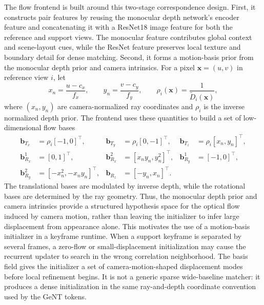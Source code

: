 The flow frontend is built around this two-stage correspondence design.
First, it constructs pair features by reusing the monocular depth network's encoder feature and concatenating it with a ResNet18 image feature for both the reference and support views.
The monocular feature contributes global context and scene-layout cues, while the ResNet feature preserves local texture and boundary detail for dense matching.
Second, it forms a motion-basis prior from the monocular depth prior and camera intrinsics.
For a pixel $\bm{x}=(u,v)$ in reference view $i$, let
\begin{equation}
    x_n=\frac{u-c_x}{f_x},\qquad
    y_n=\frac{v-c_y}{f_y},\qquad
    \rho_i(\bm{x})=\frac{1}{\tilde{D}_i(\bm{x})},
    \label{eq:geont_flow_ray_depth}
\end{equation}
where $(x_n,y_n)$ are camera-normalized ray coordinates and $\rho_i$ is the inverse normalized depth prior.
The frontend uses these quantities to build a set of low-dimensional flow bases~\cite{Poggi_2025_ICCV}
\begin{equation}
\begin{aligned}
    \bm{b}_{T_x} &= \rho_i[-1,0]^\top, &
    \bm{b}_{T_y} &= \rho_i[0,-1]^\top, &
    \bm{b}_{T_z} &= \rho_i[x_n,y_n]^\top, \\
    \bm{b}_{R_x}^{1} &= [0,1]^\top, &
    \bm{b}_{R_x}^{2} &= [x_ny_n,y_n^2]^\top, &
    \bm{b}_{R_y}^{1} &= [-1,0]^\top, \\
    \bm{b}_{R_y}^{2} &= [-x_n^2,-x_ny_n]^\top, &
    \bm{b}_{R_z} &= [-y_n,x_n]^\top .
\end{aligned}
\label{eq:geont_motion_basis}
\end{equation}
The translational bases are modulated by inverse depth, while the rotational bases are determined by the ray geometry.
Thus, the monocular depth prior and camera intrinsics provide a structured hypothesis space for the optical flow induced by camera motion, rather than leaving the initializer to infer large displacement from appearance alone.
This motivates the use of a motion-basis initializer in a keyframe runtime.
When a support keyframe is separated by several frames, a zero-flow or small-displacement initialization may cause the recurrent updater to search in the wrong correlation neighborhood.
The basis field gives the initializer a set of camera-motion-shaped displacement modes before local refinement begins.
It is not a generic sparse wide-baseline matcher: it produces a dense initialization in the same ray-and-depth coordinate convention used by the GeNT tokens.

